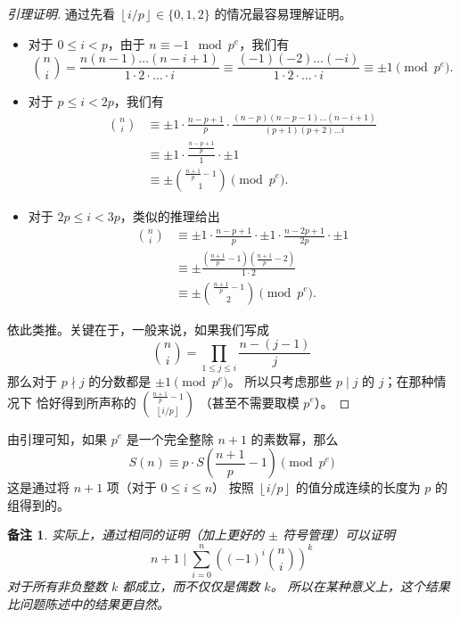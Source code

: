 \documentclass[11pt]{article}
\theoremstyle{claimstyle}
\theoremstyle{remarkstyle}
\newtheorem{remark}{备注}
\begin{document}
\begin{proof}[引理证明]
  通过先看 $\left\lfloor i/p \right\rfloor \in \{0,1,2\}$ 的情况最容易理解证明。
  \begin{itemize}
  \item 对于 $0 \le i < p$，由于 $n \equiv -1 \mod p^e$，我们有
  \[ \binom{n}{i} = \frac{n(n-1) \dots (n-i+1)}{1 \cdot 2 \cdot \dots \cdot i}
    \equiv \frac{(-1)(-2) \dots (-i)}{1 \cdot 2 \cdot \dots \cdot i} \equiv \pm 1 \pmod{p^e}. \]
  \item 对于 $p \le i < 2p$，我们有
  \begin{align*}
    \binom{n}{i}
    &\equiv \pm 1 \cdot \frac{n-p+1}{p} \cdot \frac{(n-p)(n-p-1) \dots (n-i+1)}{(p+1)(p+2) \dots i} \\
    &\equiv \pm 1 \cdot \frac{\frac{n-p+1}{p}}{1} \cdot \pm 1 \\
    &\equiv \pm \binom{\frac{n+1}{p}-1}{1} \pmod{p^e}.
  \end{align*}
  \item 对于 $2p \le i < 3p$，类似的推理给出
  \begin{align*}
    \binom ni
    &\equiv \pm 1 \cdot \frac{n-p+1}{p} \cdot \pm 1 \cdot \frac{n-2p+1}{2p} \cdot \pm 1 \\
    &\equiv \pm \frac{\left(\frac{n+1}{p}-1\right)\left( \frac{n+1}{p}-2 \right) }{1 \cdot 2} \\
    &\equiv \pm \binom{\frac{n+1}{p}-1}{2} \pmod{p^e}.
  \end{align*}
  \end{itemize}
  依此类推。关键在于，一般来说，如果我们写成
  \[ \binom ni = \prod_{1 \le j \le i} \frac{n-(j-1)}{j} \]
  那么对于 $p \nmid j$ 的分数都是 $\pm 1 \pmod{p^e}$。
  所以只考虑那些 $p \mid j$ 的 $j$；在那种情况下
  恰好得到所声称的 $\binom{\frac{n+1}{p}-1}{\left\lfloor i/p \right\rfloor}$
  （甚至不需要取模 $p^e$）。
\end{proof}

由引理可知，如果 $p^e$ 是一个完全整除 $n+1$ 的素数幂，那么
\[ S(n) \equiv p \cdot S\left( \frac{n+1}{p}-1 \right) \pmod{p^e} \]
这是通过将 $n+1$ 项（对于 $0 \le i \le n$）
按照 $\left\lfloor i/p \right\rfloor$ 的值分成连续的长度为 $p$ 的组得到的。

\begin{remark}
  实际上，通过相同的证明（加上更好的 $\pm$ 符号管理）可以证明
  \[ n+1 \mid \sum_{i=0}^n \left( (-1)^i \binom ni \right)^k \]
  对于\emph{所有}非负整数 $k$ 都成立，而不仅仅是偶数 $k$。
  所以在某种意义上，这个结果比问题陈述中的结果更自然。
\end{remark}
\end{document}
